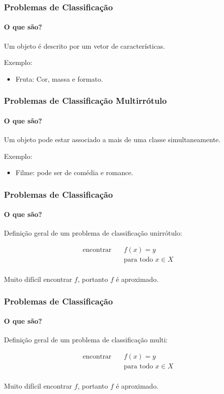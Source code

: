 \documentclass[10pt,fleqn]{beamer}
\begin{document}
\begin{frame}
  \frametitle{Problemas de Classificação}
  \framesubtitle{O que são?}
  
  Um objeto é descrito por um vetor de características.
  
    \begin{exampleblock}{Exemplo:}
  \begin{itemize}
   \item Fruta: Cor, massa e formato.
  \end{itemize}
  
 \end{exampleblock}
\end{frame}

\begin{frame}
  \frametitle{Problemas de Classificação Multirrótulo}
  \framesubtitle{O que são?}
  
  Um objeto pode estar associado a mais de uma classe simultaneamente.
  
    \begin{exampleblock}{Exemplo:}
  \begin{itemize}
   \item Filme: pode ser de comédia e romance.
  \end{itemize}
  
 \end{exampleblock}
\end{frame}


\begin{frame}
  \frametitle{Problemas de Classificação}
  \framesubtitle{O que são?}
  
  Definição geral de um problema de classificação unirrótulo:
  
  \vspace{10pt}
  \begin{align}
    \textrm{encontrar}
      \quad & f(x)=y \\
  	  \quad & \textrm{para todo }x \in X \nonumber \\
	  \nonumber
  \end{align}
  
  Muito difícil encontrar $f$, portanto $f$ é aproximado.
  
\end{frame}


\begin{frame}
  \frametitle{Problemas de Classificação}
  \framesubtitle{O que são?}
  
  Definição geral de um problema de classificação multi:
  
  \vspace{10pt}
  \begin{align}
    \textrm{encontrar}
      \quad & f(x)=y \\
  	  \quad & \textrm{para todo }x \in X \nonumber \\
	  \nonumber
  \end{align}
  
  Muito difícil encontrar $f$, portanto $f$ é aproximado.
  
\end{frame}
\end{document}

